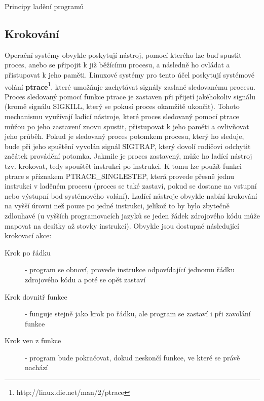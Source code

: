 \documentclass[bc,male,python,dept460]{diploma}						%
\begin{document}
\begin{section}{Principy ladění programů}
	\subsection{Krokování}
		Operační systémy obvykle poskytují nástroj, pomocí kterého lze buď spustit proces, anebo se připojit k již běžícímu procesu, a následně ho ovládat
		a přistupovat k jeho paměti. Linuxové systémy pro tento účel poskytují systémové volání \textbf{ptrace}\footnote{http://linux.die.net/man/2/ptrace},
		které umožňuje zachytávat signály zaslané sledovanému procesu. Proces sledovaný pomocí funkce ptrace je zastaven při přijetí jakéhokoliv signálu
		(kromě signálu SIGKILL, který se pokusí proces okamžitě ukončit). Tohoto mechanismu využívají ladící nástroje, které proces sledovaný pomocí
		ptrace můžou po jeho zastavení znovu spustit, přistupovat k jeho paměti a ovlivňovat jeho průběh. Pokud je sledovaný proces potomkem procesu,
		který ho sleduje, bude při jeho spuštění vyvolán signál SIGTRAP, který dovolí rodičovi odchytit začátek provádění potomka. Jakmile je proces
		zastavený, může ho ladící nástroj tzv. krokovat, tedy spouštět instrukci po instrukci. K tomu lze použít funkci ptrace s příznakem PTRACE\_SINGLESTEP,
		která provede přesně jednu instrukci v laděném procesu (proces se také zastaví, pokud se dostane na vstupní nebo výstupní bod systémového volání).
		Ladící nástroje obvykle nabízí krokování na vyšší úrovni než pouze po jedné instrukci, jelikož to by bylo zbytečně zdlouhavé (u vyšších programovacích
		jazyků se jeden řádek zdrojového kódu může mapovat na desítky až stovky instrukcí). Obvykle jsou dostupné následující krokovací akce:
		\begin{description}
			\item[Krok po řádku] - program se obnoví, provede instrukce odpovídající jednomu řádku zdrojového kódu a poté se opět zastaví
			\item[Krok dovnitř funkce] - funguje stejně jako krok po řádku, ale program se zastaví i při zavolání funkce
			\item[Krok ven z funkce] - program bude pokračovat, dokud neskončí funkce, ve které se právě nachází
		\end{description}
		

\end{section}
\end{document}
